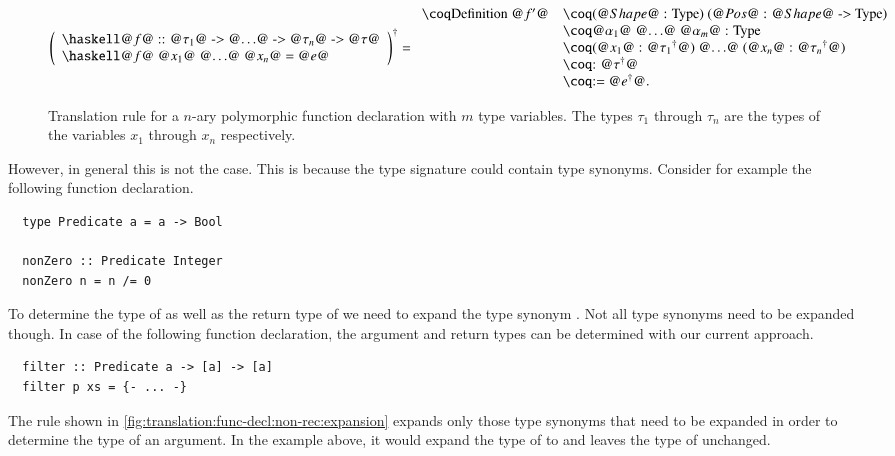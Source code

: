 \begin{figure}[H]
  \[
    \toCoq{\left(
      \begin{array}{l}
        \haskellM{@$f$@ :: @$\tau_1$@ -> @$\ldots$@ -> @$\tau_n$@ -> @$\tau$@} \\
        \haskellM{@$f$@ @$x_1$@ @$\ldots$@ @$x_n$@ = @$e$@}
      \end{array}
    \right)}
    = \begin{array}{ll}
        \coqM{Definition @$f'$@}
          &\coqM{(@$\Shape$@ : Type) (@$\Pos$@ : @$\Shape$@ -> Type)}     \\
          &\coqM{{@$\alpha_1$@ @$\ldots$@ @$\alpha_m$@ : Type}}           \\
          &\coqM{(@$x_1$@ : @${\tau_1}^{\dagger}$@) @$\ldots$@ (@$x_n$@ : @${\tau_n}^{\dagger}$@)}                                        \\
          &\coqM{: @${\tau}^{\dagger}$@}                                  \\
          &\coqM{:= @$\toCoq{e}$@.}                                       \\
      \end{array}
  \]
  \caption{
    Translation rule for a $n$-ary polymorphic function declaration with $m$ type variables.
    The types $\tau_1$ through $\tau_n$ are the types of the variables $x_1$ through $x_n$ respectively.
  }
  \label{fig:translation:func-decl:non-rec}
\end{figure}

However, in general this is not the case.
This is because the type signature could contain type synonyms.
Consider for example the following function declaration.
\begin{verbatim}
  type Predicate a = a -> Bool

  nonZero :: Predicate Integer
  nonZero n = n /= 0
\end{verbatim}
To determine the type of  as well as the return type of  we need to expand the type synonym .
Not all type synonyms need to be expanded though.
In case of the following function declaration, the argument and return types can be determined with our current approach.
\begin{verbatim}
  filter :: Predicate a -> [a] -> [a]
  filter p xs = {- ... -}
\end{verbatim}

The rule shown in \autoref{fig:translation:func-decl:non-rec:expansion} expands only those type synonyms that need to be expanded in order to determine the type of an argument.
In the example above, it would expand the type of  to  and leaves the type of  unchanged.

